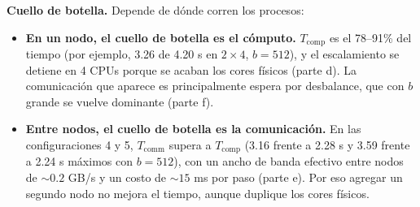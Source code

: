 \documentclass[11pt,a4paper]{article}
\newcommand{\Tcomp}{T_{\text{comp}}}
\newcommand{\Tcomm}{T_{\text{comm}}}
\begin{document}
\textbf{Cuello de botella.} Depende de dónde corren los procesos:
\begin{itemize}
  \item \textbf{En un nodo, el cuello de botella es el cómputo.} $\Tcomp$ es el 78--91\% del tiempo (por ejemplo, 3.26 de 4.20 s en $2\times4$, $b=512$), y el escalamiento se detiene en 4 CPUs porque se acaban los cores físicos (parte d). La comunicación que aparece es principalmente espera por desbalance, que con $b$ grande se vuelve dominante (parte f).
  \item \textbf{Entre nodos, el cuello de botella es la comunicación.} En las configuraciones 4 y 5, $\Tcomm$ supera a $\Tcomp$ (3.16 frente a 2.28 s y 3.59 frente a 2.24 s máximos con $b=512$), con un ancho de banda efectivo entre nodos de $\sim0.2$ GB/s y un costo de $\sim15$ ms por paso (parte e). Por eso agregar un segundo nodo no mejora el tiempo, aunque duplique los cores físicos.
\end{itemize}

\end{document}
